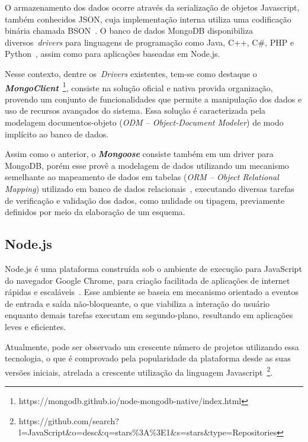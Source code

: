 \documentclass[12pt]{article}
\begin{document}
O armazenamento dos dados ocorre através da serialização de objetos Javascript, também conhecidos JSON, cuja implementação interna utiliza uma codificação binária chamada BSON~\cite{bson}. O banco de dados MongoDB disponibiliza diversos~\emph{drivers} para linguagens de programação como Java, C++, C\#, PHP e Python~\cite{lutu2015big}, assim como para aplicações baseadas em Node.js.

Nesse contexto, dentre os~\emph{Drivers} existentes, tem-se como destaque o \textbf{\textit{MongoClient}}~\footnote{https://mongodb.github.io/node-mongodb-native/index.html}, consiste na solução oficial e nativa provida organização, provendo um conjunto de funcionalidades que permite a manipulação dos dados e uso de recursos avançados do sistema. Essa solução é caracterizada pela modelagem documentos-objeto (\emph{ODM -- Object-Document Modeler}) de modo implícito ao banco de dados.

Assim como o anterior, o \textbf{\textit{Mongoose}} consiste também em um driver para MongoDB, porém esse provê a modelagem de dados utilizando um mecanismo semelhante ao mapeamento de dados em tabelas (\emph{ORM -- Object Relational Mapping}) utilizado em banco de dados relacionais~\cite{mardan2014boosting}, executando diversas tarefas de verificação e validação dos dados, como nulidade ou tipagem, previamente definidos por meio da elaboração de um esquema.

\subsection{Node.js}
\label{subsection:nodejs}

Node.js é uma plataforma construída sob o ambiente de execução para JavaScript do navegador Google Chrome, para criação facilitada de aplicações de internet rápidas e escaláveis~\cite{nodejs}. Esse ambiente se baseia em mecanismo orientado a eventos de entrada e saída não-bloqueante, o que viabiliza a interação do usuário enquanto demais tarefas executam em segundo-plano, resultando em aplicações leves e eficientes.

Atualmente, pode ser observado um crescente número de projetos utilizando essa tecnologia, o que é comprovado pela popularidade da plataforma desde as suas versões iniciais, atrelada a crescente utilização da linguagem Javascript~\footnote{https://github.com/search?l=JavaScript\&o=desc\&q=stars\%3A\%3E1\&s=stars\&type=Repositories}.

\end{document}

